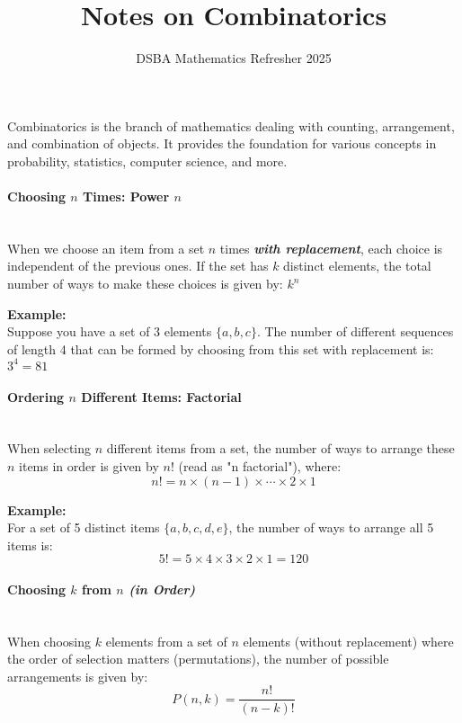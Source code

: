 \documentclass[]{article}
\title{Notes on Combinatorics}
\author{DSBA Mathematics Refresher 2025}
\date{}
\begin{document}
	
	\maketitle
	
	\begin{abstract}
		
	\end{abstract}
	
	
	Combinatorics is the branch of mathematics dealing with counting, arrangement, and combination of objects.
	It provides the foundation for various concepts in probability, statistics, computer science, and more.
	
	\paragraph{Choosing $n$ Times: Power $n$}
	\noindent\\
	When we choose an item from a set $n$ times \textit{\textbf{with replacement}}, each choice is independent of the previous ones.
	If the set has $k$ distinct elements, the total number of ways to make these choices is given by:
	$ k^n $
	
	\textbf{Example:}
	\noindent\\
	Suppose you have a set of 3 elements $\{a, b, c\}$.
	The number of different sequences of length 4 that can be formed by choosing from this set with replacement is:
	$ 3^4 = 81 $
	
	\paragraph{Ordering $n$ Different Items: Factorial}
	\noindent\\
	When selecting $n$ different items from a set, the number of ways to arrange these $n$ items in order is given by $n!$ (read as "n factorial"), where:
	$$
	n! = n \times (n-1) \times \cdots \times 2 \times 1
	$$
	
	\textbf{Example:}
	\noindent\\
	For a set of 5 distinct items $\{a, b, c, d, e\}$, the number of ways to arrange all 5 items is:
	$$
	5!
	= 5 \times 4 \times 3 \times 2 \times 1
	= 120
	$$
	
	\paragraph{Choosing $k$ from $n$ \textit{(in Order)}}
	\noindent\\
	When choosing $k$ elements from a set of $n$ elements (without replacement) where the order of selection matters (permutations), the number of possible arrangements is given by:
	$$
	P(n, k) = \frac{n!}{(n-k)!}
	$$
	
\end{document}
